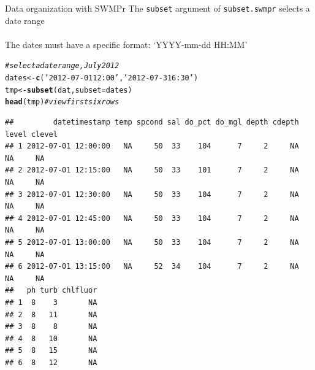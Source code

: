 \documentclass[xcolor=dvipsnames,serif]{beamer}\usepackage[]{graphicx}\usepackage[]{color}
\makeatletter
\newcommand{\hlstr}[1]{\textcolor[rgb]{0.192,0.494,0.8}{#1}}%
\newcommand{\hlcom}[1]{\textcolor[rgb]{0.678,0.584,0.686}{\textit{#1}}}%
\newcommand{\hlstd}[1]{\textcolor[rgb]{0.345,0.345,0.345}{#1}}%
\newcommand{\hlkwb}[1]{\textcolor[rgb]{0.69,0.353,0.396}{#1}}%
\newcommand{\hlkwc}[1]{\textcolor[rgb]{0.333,0.667,0.333}{#1}}%
\newcommand{\hlkwd}[1]{\textcolor[rgb]{0.737,0.353,0.396}{\textbf{#1}}}%
\newenvironment{kframe}{%
 \def\at@end@of@kframe{}%
 \ifinner\ifhmode%
  \def\at@end@of@kframe{\end{minipage}}%
  \begin{minipage}{\columnwidth}%
 \fi\fi%
 \def\FrameCommand##1{\hskip\@totalleftmargin \hskip-\fboxsep
 \colorbox{shadecolor}{##1}\hskip-\fboxsep
     \hskip-\linewidth \hskip-\@totalleftmargin \hskip\columnwidth}%
 \MakeFramed {\advance\hsize-\width
   \@totalleftmargin\z@ \linewidth\hsize
   \@setminipage}}%
 {\par\unskip\endMakeFramed%
 \at@end@of@kframe}
\newenvironment{knitrout}{}{} %
\makeatother
\begin{document}
\begin{frame}[fragile]{Data organization with SWMPr}
The \texttt{subset} argument of \texttt{subset.swmpr} selects a date range \\~\\
The dates must have a specific format: `YYYY-mm-dd HH:MM'
\begin{knitrout}\scriptsize
{}\color{fgcolor}\begin{kframe}
\begin{alltt}
\hlcom{# select a date range, July 2012}
\hlstd{dates} \hlkwb{<-} \hlkwd{c}\hlstd{(}\hlstr{'2012-07-01 12:00'}\hlstd{,} \hlstr{'2012-07-31 6:30'}\hlstd{)}
\hlstd{tmp} \hlkwb{<-} \hlkwd{subset}\hlstd{(dat,} \hlkwc{subset} \hlstd{= dates)}
\hlkwd{head}\hlstd{(tmp)} \hlcom{# view first six rows}
\end{alltt}
\begin{verbatim}
##         datetimestamp temp spcond sal do_pct do_mgl depth cdepth level clevel
## 1 2012-07-01 12:00:00   NA     50  33    104      7     2     NA    NA     NA
## 2 2012-07-01 12:15:00   NA     50  33    101      7     2     NA    NA     NA
## 3 2012-07-01 12:30:00   NA     50  33    104      7     2     NA    NA     NA
## 4 2012-07-01 12:45:00   NA     50  33    104      7     2     NA    NA     NA
## 5 2012-07-01 13:00:00   NA     50  33    104      7     2     NA    NA     NA
## 6 2012-07-01 13:15:00   NA     52  34    104      7     2     NA    NA     NA
##   ph turb chlfluor
## 1  8    3       NA
## 2  8   11       NA
## 3  8    8       NA
## 4  8   10       NA
## 5  8   15       NA
## 6  8   12       NA
\end{verbatim}
\end{kframe}
\end{knitrout}
\end{frame}
\end{document}
